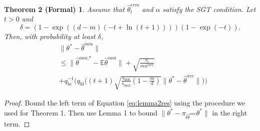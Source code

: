 \documentclass[twoside]{article}
\newcommand{\smin}{s_\text{min}}
\newcommand{\smax}{s_\text{max}}
\newcommand{\qhi}{q_\text{hi}}
\newcommand{\qlo}{q_\text{lo}}
\newcommand{\nowa}{n^{\textit{owa}}}
\newcommand{\W}{{\hat \Theta^{\textit{owa}}}}
\newcommand{\E}{\mathbb{E}}
\newcommand{\w}{\theta}
\newcommand{\wowa}{\hat\w^{owa}}
\newcommand{\wowastar}{\hat\w^{\textit{owa,*}}}
\newcommand{\wave}{\hat\w^{ave}}
\newcommand{\wmle}{\hat\w^{erm}}
\newcommand{\wstar}{{\w^{*}}}
\newcommand{\ltwo}[1]{{\lVert {#1} \rVert}}
\newcommand{\proj}[1]{\pi_{{#1}}}
\begin{document}

\newtheorem*{theoremformal}{Theorem 2 (Formal)}
\begin{theoremformal}
Assume that $\wmle_i$ and $\alpha$ satisfy the SGT condition.
Let $t>0$ and
\begin{equation}
\delta = (1-\exp((d-m)(-t+\ln(t+1))))(1-\exp(-t))
.
\end{equation}
Then, with probability at least $\delta$,
\begin{equation}
\begin{aligned}
&\ltwo{\wstar-\wowa}
\\
&\le
\ltwo{\wowastar-\E\wowa}
+ \sqrt{\frac{v_t}{m\nowa}}
\\
&+
\qlo^{-1}\bigg(\qhi\bigg((t+1)\sqrt{\frac{\smin}{\smax}\left(1-\frac{m}{d}\right)}\ltwo{\wstar-\wave}\bigg)\bigg)
\end{aligned}
\end{equation}
\end{theoremformal}

\begin{proof}
Bound the left term of Equation \ref{eq:lemma2res} using the procedure we used for Theorem 1.
Then use Lemma 1 to bound $\ltwo{\wstar-\proj\W\wstar}$ in the right term.
\end{proof}
\end{document}
